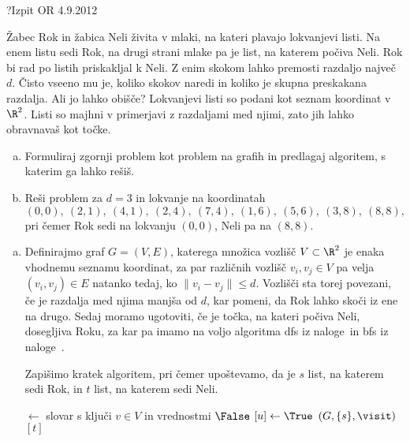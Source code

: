 \begin{naloga}{?}{Izpit OR 4.9.2012}
\begin{vprasanje}
Žabec Rok in žabica Neli živita v mlaki,
na kateri plavajo lokvanjevi listi.
Na enem listu sedi Rok,
na drugi strani mlake pa je list, na katerem počiva Neli.
Rok bi rad po listih priskakljal k Neli.
Z enim skokom lahko premosti razdaljo največ $d$.
Čisto vseeno mu je, koliko skokov naredi
in koliko je skupna preskakana razdalja.
Ali jo lahko obišče?
Lokvanjevi listi so podani kot seznam koordinat v $\R^2$.
Listi so majhni v primerjavi z razdaljami med njimi,
zato jih lahko obravnavaš kot točke.

\begin{enumerate}[(a)]
\item Formuliraj zgornji problem kot problem na grafih in predlagaj algoritem,
s katerim ga lahko rešiš.

\item Reši problem za $d = 3$ in lokvanje na koordinatah
$$
(0, 0), \ (2, 1), \ (4, 1), \ (2, 4), \ (7, 4),
\ (1, 6), \ (5, 6), \ (3, 8), \ (8, 8),
$$
pri čemer Rok sedi na lokvanju $(0, 0)$, Neli pa na $(8, 8)$.
\end{enumerate}
\end{vprasanje}

\begin{odgovor}
\begin{enumerate}[(a)]
\item Definirajmo graf $G = (V, E)$,
katerega množica vozlišč $V \subset \R^2$
je enaka vhod\-nemu seznamu koordinat,
za par različnih vozlišč $v_i, v_j \in V$
pa velja $(v_i, v_j) \in E$ natanko tedaj,
ko $\|v_i - v_j\|  \leq d$.
Vozlišči sta torej povezani, če je razdalja med njima manjša od $d$,
kar pomeni, da Rok lahko skoči iz ene na drugo.
Sedaj moramo ugotoviti, če je točka, na kateri počiva Neli, dosegljiva Roku, 
za kar pa imamo na voljo algoritma {\sc dfs} iz naloge~\res[dfs]
in {\sc bfs} iz naloge~\res[bfs].

Zapišimo kratek algoritem, pri čemer upoštevamo, da je $s$ list, na katerem sedi Rok, in $t$ list, na katerem sedi Neli.
\begin{small}
\begin{algorithmic}
	 $\gets$ slovar s ključi $v \in V$
                                 in vrednostmi $\False$
		$[u] \gets \True$
	\EndFunction
	$(G, \{s\}, \visit)$
	\State {}$[t]$
\EndFunction
\end{algorithmic}
\end{small}


\end{enumerate}
\end{odgovor}
\end{naloga}
